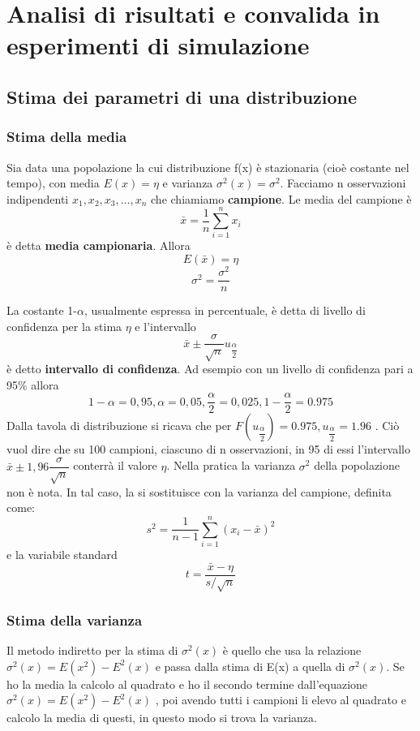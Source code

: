 \chapter{Analisi di risultati e convalida in esperimenti di simulazione}

\section{Stima dei parametri di una distribuzione}
\subsection{Stima della media}
Sia data una popolazione la cui distribuzione f(x) è stazionaria (cioè costante nel tempo), con media $E(x) = \eta $ e varianza $\sigma^2(x)= \sigma^2$. Facciamo n osservazioni indipendenti $x_1,x_2,x_3,...,x_n$ che chiamiamo \textbf{campione}. Le media del campione è 
\[ \bar{x} = \dfrac{1}{n}\sum_{i=1}^{n} x_i\]
è detta \textbf{media campionaria}.
Allora 
\[E(\bar{x}) = \eta\]
\[\sigma^2 = \dfrac{\sigma^2}{n}\]

La costante 1-$\alpha$, usualmente espressa in percentuale, è detta di livello di confidenza per la stima $\eta$ e l'intervallo 
\[ \bar{x} \pm \dfrac{\sigma}{\sqrt{n}} u_{\dfrac{\alpha}{2}}\]
è detto \textbf{intervallo di confidenza}. Ad esempio con un livello di confidenza pari a 95\% allora 
\[1-\alpha = 0,95, \alpha = 0,05, \dfrac{\alpha}{2}= 0,025, 1- \dfrac{\alpha}{2}= 0.975\]
Dalla tavola di distribuzione si ricava che per $F(u_{\dfrac{\alpha}{2}})= 0.975, u_{\dfrac{\alpha}{2}}= 1.96$ .
Ciò vuol dire che su 100 campioni, ciascuno di n osservazioni, in 95 di essi l'intervallo $\bar{x} \pm 1,96 \dfrac{\sigma}{\sqrt{n}}$ conterrà il valore $\eta$.
Nella pratica la varianza $\sigma^2$ della popolazione non è nota. In tal caso, la si sostituisce con la varianza del campione, definita come:
\[ s^2 = \dfrac{1}{n-1} \sum_{i=1}^{n}(x_i- \bar{x})^2\]
e la variabile standard 
\[ t = \dfrac{\bar{x}-\eta}{s/\sqrt{n}}\]

\subsection{Stima della varianza}
Il metodo indiretto  per la stima di $\sigma^2(x)$ è quello che usa la relazione $\sigma^2(x)= E(x^2) -E^2(x)$ e passa dalla stima di E(x) a quella di $\sigma^2(x)$. Se ho la media la calcolo al quadrato e ho il secondo termine dall'equazione $\sigma^2(x)= E(x^2) -E^2(x)$ , poi avendo tutti i campioni li elevo al quadrato e calcolo la media di questi, in questo modo si trova la varianza.

